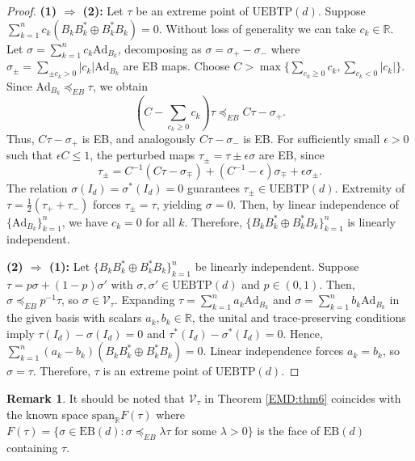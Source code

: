 \documentclass[11pt,reqno]{amsart}
\theoremstyle{definition}
\newtheorem{rmk}[defn]{Remark}
\theoremstyle{plain}
\theoremstyle{remark}
\numberwithin{equation}{section}%
\begin{document}
\begin{proof}
	\noindent\textbf{(1) $\Rightarrow$ (2):} Let $\tau$ be an extreme point of $\mathrm{UEBTP}(d)$. Suppose
    $\sum_{k=1}^n c_k(B_k B_k^* \oplus B_k^* B_k) = 0$. Without loss of generality we can take  $c_k \in \mathbb{R}$. Let $\sigma = \sum_{k=1}^n c_k \text{Ad}_{B_k}$, decomposing as $\sigma = \sigma_+ - \sigma_-$ where $\sigma_{\pm} = \sum_{\pm c_k > 0} |c_k| \text{Ad}_{B_k}$ are EB maps. Choose $C > \max\{ \sum_{c_k \ge 0} c_k, \sum_{c_k < 0} |c_k| \}$. Since $\text{Ad}_{B_k} \preccurlyeq_{EB} \tau$, we obtain 
	\[
	\left(C - \sum_{c_k \ge 0} c_k\right)\tau \preccurlyeq_{EB} C\tau - \sigma_+.
	\]
	Thus, $C\tau - \sigma_+$ is EB, and analogously $C\tau - \sigma_-$ is EB. For sufficiently small $\epsilon > 0$ such that $\epsilon C \le 1$, the perturbed maps $\tau_{\pm} = \tau \pm \epsilon \sigma$ are EB, since 
	\[\tau_{\pm} = C^{-1}(C\tau - \sigma_{\mp}) + (C^{-1} - \epsilon)\sigma_{\mp} + \epsilon \sigma_{\pm}.\]
	The relation $\sigma(I_d) = \sigma^*(I_d) = 0$ guarantees $\tau_{\pm} \in \mathrm{UEBTP}(d)$. Extremity of $\tau = \frac{1}{2}(\tau_+ + \tau_-)$ forces $\tau_{\pm} = \tau$, yielding $\sigma = 0$. Then, by linear independence of $\{\text{Ad}_{B_k}\}_{k=1}^n$, we have $c_k = 0$ for all $k$. Therefore, $\{B_k B_k^* \oplus B_k^* B_k\}_{k=1}^n$ is linearly independent.
	
	
	 \noindent\textbf{(2) $\Rightarrow$ (1): } Let $\{B_k B_k^* \oplus B_k^* B_k\}_{k=1}^n$ be linearly independent. Suppose $\tau = p\sigma + (1-p)\sigma'$ with $\sigma, \sigma' \in \mathrm{UEBTP}(d)$ and $p \in (0,1)$. Then, $\sigma \preccurlyeq_{EB} p^{-1}\tau$, so $\sigma \in \mathcal{V}_\tau$. Expanding $\tau = \sum_{k=1}^n a_k \text{Ad}_{B_k}$ and $\sigma = \sum_{k=1}^n b_k \text{Ad}_{B_k}$ in the given basis with scalars $a_k,b_k\in\mathbb{R}$, the unital and trace-preserving conditions imply $\tau(I_d) - \sigma(I_d) = 0$ and $\tau^*(I_d) - \sigma^*(I_d) = 0$. Hence, $\sum_{k=1}^n (a_k - b_k)(B_k B_k^* \oplus B_k^* B_k) = 0$. Linear independence forces $a_k = b_k$, so $\sigma = \tau$. Therefore, $\tau$ is an extreme point of $\mathrm{UEBTP}(d)$.
\end{proof}



\begin{rmk}
	It should be noted that $\mathcal{V}_\tau$ in Theorem \ref{EMD:thm6} coincides with the known space $\text{span}_{\mathbb{R}} F(\tau)$ where $F(\tau) = \{ \sigma \in \mathrm{EB}(d) : \sigma \preccurlyeq_{EB} \lambda\tau \text{ for some } \lambda > 0 \}$ is the face of $\mathrm{EB}(d)$ containing $\tau$.
\end{rmk}
\end{document}
